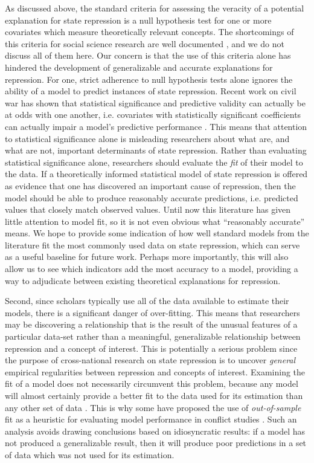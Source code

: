 \documentclass[12pt]{article}
\begin{document}
As discussed above, the standard criteria for assessing the veracity of a potential explanation for state repression is a null hypothesis test for one or more covariates which measure theoretically relevant concepts. The shortcomings of this criteria for social science research are well documented \citep[See, e.g.][]{Gill1999}, and we do not discuss all of them here. Our concern is that the use of this criteria alone has hindered the development of generalizable and accurate explanations for repression. For one, strict adherence to null hypothesis tests alone ignores the ability of a model to predict instances of state repression. Recent work on civil war has shown that statistical significance and predictive validity can actually be at odds with one another, i.e. covariates with statistically significant coefficients can actually impair a model's predictive performance \citep{Wardetal2010}. This means that attention to statistical significance alone is misleading researchers about what are, and what are not, important determinants of state repression. Rather than evaluating statistical significance alone, researchers should evaluate the {\em fit} of their model to the data. If a theoretically informed statistical model of state repression is offered as evidence that one has discovered an important cause of repression, then the model should be able to produce reasonably accurate predictions, i.e. predicted values that closely match observed values. Until now this literature has given little attention to model fit, so it is not even obvious what ``reasonably accurate'' means. We hope to provide some indication of how well standard models from the literature fit the most commonly used data on state repression, which can serve as a useful baseline for future work. Perhaps more importantly, this will also allow us to see which indicators add the most accuracy to a model, providing a way to adjudicate between existing theoretical explanations for repression.

Second, since scholars typically use all of the data available to estimate their models, there is a significant danger of over-fitting. This means that researchers may be discovering a relationship that is the result of the unusual features of a particular data-set rather than a meaningful, generalizable relationship between repression and a concept of interest. This is potentially a serious problem since the purpose of cross-national research on state repression is to uncover {\em general} empirical regularities between repression and concepts of interest. Examining the fit of a model does not necessarily circumvent this problem, because any model will almost certainly provide a better fit to the data used for its estimation than any other set of data \citep[See, e.g.][]{PicardCook1984}. This is why some have proposed the use of {\em out-of-sample} fit as a heuristic for evaluating model performance in conflict studies \citep{BeckKingZeng2000,Wardetal2010}. Such an analysis avoids drawing conclusions based on idiosyncratic results: if a model has not produced a generalizable result, then it will produce poor predictions in a set of data which was not used for its estimation. 
\end{document}

